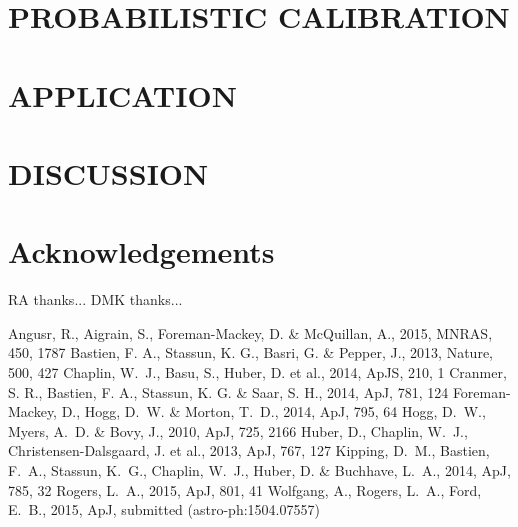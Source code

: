 \documentclass[apjl]{emulateapj}
\begin{document}
\section{PROBABILISTIC CALIBRATION}
\label{sec:HBM}



\section{APPLICATION}
\label{sec:appication}



\section{DISCUSSION}
\label{sec:discussion}



\acknowledgements
\section*{Acknowledgements}

RA thanks...
DMK thanks...


\begin{thebibliography}{99}
Angusr, R., Aigrain, S., Foreman-Mackey, D. \& McQuillan, A., 2015, MNRAS,
450, 1787
 Bastien,
F. A., Stassun, K. G., Basri, G. \& Pepper, J., 2013, Nature, 500, 427
Chaplin, W.~J., Basu, S., Huber, D. et al., 2014, ApJS, 210, 1
Cranmer, S. R., Bastien, F. A., Stassun, K. G. \& Saar, S. H., 2014, ApJ, 781,
124
 Foreman-Mackey, D., Hogg, D.~W. \& Morton, T.~D., 2014,
ApJ, 795, 64
Hogg, D.~W., Myers, A.~D. \& Bovy, J., 2010, ApJ, 725,
2166
Huber, D., Chaplin, W.~J., Christensen-Dalsgaard, J. et al., 2013, ApJ, 767,
127
Kipping, D.~M., Bastien, F.~A., Stassun, K.~G., Chaplin, W.~J., Huber, D. \&
Buchhave, L.~A., 2014, ApJ, 785, 32
Rogers, L.~A., 2015, ApJ, 801, 41
Wolfgang, A., Rogers, L.~A., Ford, E.~B., 2015, ApJ, submitted
(astro-ph:1504.07557)
\end{thebibliography}
\end{document}
